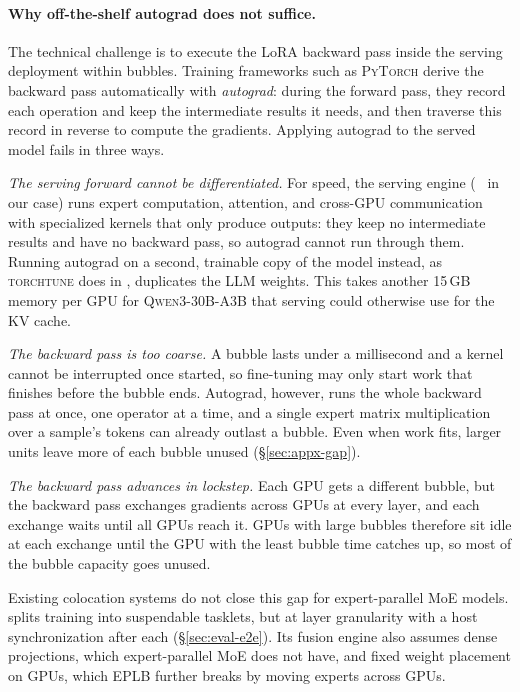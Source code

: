 \paragraph{Why off-the-shelf autograd does not suffice.}
The technical challenge is to execute the \ac{LoRA} backward pass inside the serving deployment within bubbles.
Training frameworks such as \textsc{PyTorch} derive the backward pass automatically with \emph{autograd}: during the forward pass, they record each operation and keep the intermediate results it needs, and then traverse this record in reverse to compute the gradients.
Applying autograd to the served model fails in three ways.
\begin{enumerate*}[label=(\roman*)]
    \item \emph{The serving forward cannot be differentiated.} For speed, the serving engine (\vllm~\cite{vllm} in our case) runs expert computation, attention, and cross-GPU communication with specialized kernels that only produce outputs: they keep no intermediate results and have no backward pass, so autograd cannot run through them.
    Running autograd on a second, trainable copy of the model instead, as \textsc{torchtune} does in \uncoord, duplicates the \ac{LLM} weights.
    This takes another 15\,GB memory per GPU for \textsc{Qwen3-30B-A3B} that serving could otherwise use for the \ac{KV} cache.
    \item \emph{The backward pass is too coarse.} A bubble lasts under a millisecond and a kernel cannot be interrupted once started, so fine-tuning may only start work that finishes before the bubble ends.
    Autograd, however, runs the whole backward pass at once, one operator at a time, and a single expert matrix multiplication over a sample's tokens can already outlast a bubble. Even when work fits, larger units leave more of each bubble unused (\S\ref{sec:appx-gap}).
    \item \emph{The backward pass advances in lockstep.}
    Each GPU gets a different bubble, but the backward pass exchanges gradients across GPUs at every layer, and each exchange waits until all GPUs reach it.
    GPUs with large bubbles therefore sit idle at each exchange until the GPU with the least bubble time catches up, so most of the bubble capacity goes unused.
\end{enumerate*}

Existing colocation systems do not close this gap for expert-parallel \ac{MoE} models.
\llmstation splits training into suspendable tasklets, but at layer granularity with a host synchronization after each (\S\ref{sec:eval-e2e}).
Its fusion engine also assumes dense projections, which expert-parallel \ac{MoE} does not have, and fixed weight placement on GPUs, which \ac{EPLB} further breaks by moving experts across GPUs.

